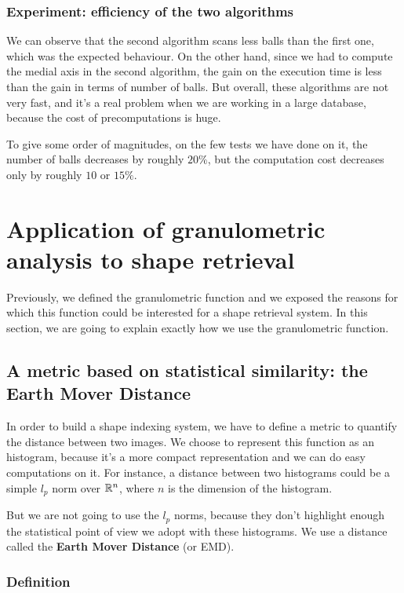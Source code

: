 \subsubsection{Experiment: efficiency of the two algorithms}

We can observe that the second algorithm scans less balls than the first one, which was the expected behaviour. On the other hand, since we had to compute the medial axis in the second algorithm, the gain on the execution time is less than the gain in terms of number of balls.
But overall, these algorithms are not very fast, and it's a real problem when we are working in a large database, because the cost of precomputations is huge.

To give some order of magnitudes, on the few tests we have done on it, the number of balls decreases by roughly $20 \%$, but the computation cost decreases only by roughly $10$ or $15 \%$.

\section{Application of granulometric analysis to shape retrieval}

Previously, we defined the granulometric function and we exposed the reasons for which this function could be interested for a shape retrieval system. In this section, we are going to explain exactly how we use the granulometric function.

\subsection{A metric based on statistical similarity: the Earth Mover Distance}

In order to build a shape indexing system, we have to define a metric to quantify the distance between two images. We choose to represent this function as an histogram, because it's a more compact representation and we can do easy computations on it. For instance, a distance between two histograms could be a simple $l_p$ norm over $\mathbb{R}^n$, where $n$ is the dimension of the histogram.

But we are not going to use the $l_p$ norms, because they don't highlight enough the statistical point of view we adopt with these histograms. We use a distance called the \textbf{Earth Mover Distance} (or EMD).

\subsubsection{Definition}

